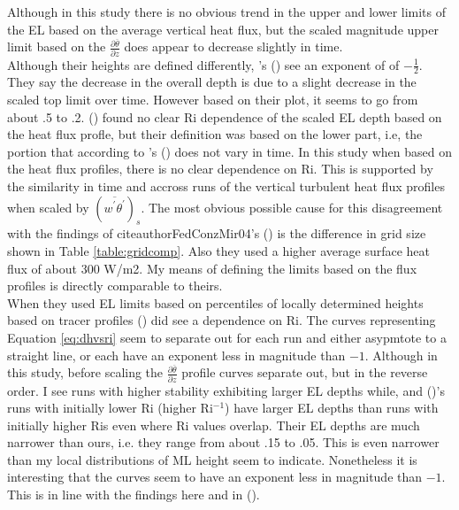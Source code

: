 {Although in this study there is no obvious trend in the upper and lower limits of the \acs{EL} based on the average vertical heat flux, but the scaled magnitude upper limit based on the $\frac{\partial \overline{\theta}}{\partial z}$ does appear to decrease slightly in time.\\


Although their heights are defined differently,  \citeauthor{FedConzMir04}'s (\citeyear{FedConzMir04}) see an exponent of of $-\frac{1}{2}$.  They say the decrease in the overall depth is due to a slight decrease in the scaled top limit over time.  However based on their plot, it seems to go from about .5 to .2. \citeauthor{BrooksFowler2} (\citeyear{BrooksFowler2}) found no clear \acs{Ri} dependence of the scaled \acs{EL} depth based on the heat flux profle, but their definition was based on the lower part, i.e, the portion that according to \citeauthor{FedConzMir04}'s (\citeyear{FedConzMir04}) does not vary in time.  In this study when based on the heat flux profiles, there is no clear dependence on \acs{Ri}. This is supported by the similarity in time and accross runs of the vertical turbulent heat flux profiles when scaled by $(\overline{w^{'}\theta^{'}})_{s}$. The most obvious possible cause for this disagreement with the findings of citeauthor{FedConzMir04}'s (\citeyear{FedConzMir04}) is the difference in grid size shown in Table \ref{table:gridcomp}. Also they used a higher average surface heat flux of about 300 W/m2. My means of defining the limits based on the flux profiles is directly comparable to theirs.\\              

When they used \acs{EL} limits based on percentiles of locally determined heights based on tracer profiles  \citeauthor{BrooksFowler2} (\citeyear{BrooksFowler2}) did see a dependence on \acs{Ri}.  The curves representing Equation \ref{eq:dhvsri} seem to separate out for each run and either asypmtote to a straight line, or each have an exponent less in magnitude than $-1$.  Although in this study, before scaling the $\frac{\partial \overline{\theta}}{\partial z}$ profile curves separate out, but in the reverse order.  I see runs with higher stability exhibiting larger \acs{EL} depths while, and \citeauthor{BrooksFowler2} (\citeyear{BrooksFowler2})'s runs with initially lower \acs{Ri} (higher \acs{Ri}$^{-1}$) have larger \acs{EL} depths than runs with initially higher \acs{Ri}s even where \acs{Ri} values overlap.  Their \acs{EL} depths are much narrower than ours, i.e. they range from about .15 to .05.  This is even narrower than my local distributions of \acs{ML} height seem to indicate.  Nonetheless it is interesting that the curves seem to have an exponent less in magnitude than $-1$.  This is in line with the findings here and in \citeauthor{FedConzMir04} (\citeyear{FedConzMir04}).\\ 

}
